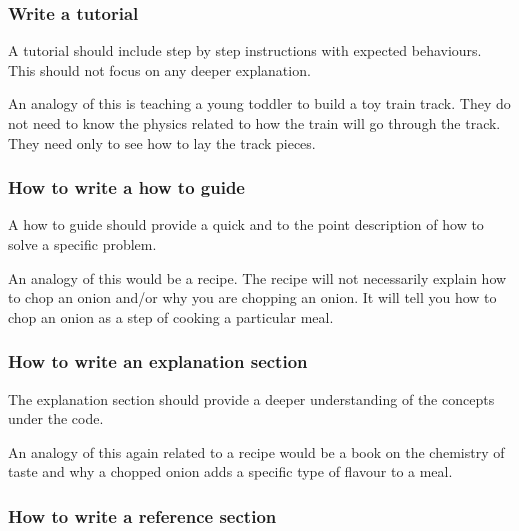 \subsubsection{Write a tutorial}

A tutorial should include step by step instructions with expected behaviours.
This should not focus on any deeper explanation.

An analogy of this is teaching a young toddler to build a toy train
track. They do not need to know the physics related to how the train will go
through the track. They need only to see how to lay the track pieces.

\subsubsection{How to write a how to guide}
\label{\detokenize{building-tools/06-documentation/how/main:how-to-write-a-how-to-guide}}\label{\detokenize{building-tools/06-documentation/how/main:id2}}

A how to guide should provide a quick and to the point description of how to
solve a specific problem.

An analogy of this would be a recipe. The recipe will not necessarily explain
how to chop an onion and/or why you are chopping an onion. It will tell you
how to chop an onion as a step of cooking a particular meal.

\subsubsection{How to write an explanation section}
\label{\detokenize{building-tools/06-documentation/how/main:how-to-write-an-explanation-section}}\label{\detokenize{building-tools/06-documentation/how/main:id3}}

The explanation section should provide a deeper understanding of the concepts
under the code.

An analogy of this again related to a recipe would be a book on the chemistry of
taste and why a chopped onion adds a specific type of flavour to a meal.

\subsubsection{How to write a reference section}
\label{\detokenize{building-tools/06-documentation/how/main:how-to-write-a-reference-section}}\label{\detokenize{building-tools/06-documentation/how/main:id4}}

